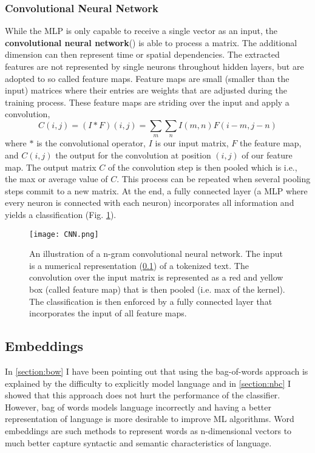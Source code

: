 \subsubsection{Convolutional Neural Network}
While the MLP is only capable to receive a single vector as an input, the \textbf{convolutional neural network}() is able to process a matrix. The additional dimension can then represent time or spatial dependencies. The extracted features are not represented by single neurons throughout hidden layers, but are adopted to so called feature maps. Feature maps are small (smaller than the input) matrices where their entries are weights that are adjusted during the training process. These feature maps are striding over the input and apply a convolution,
\[C(i,j) = (I \ast F)(i,j) = \sum_m \sum_n I(m, n) F(i-m, j-n)\] where $\ast$ is the convolutional operator, $I$ is our input matrix, $F$ the feature map, and $C(i,j)$ the output for the convolution at position $(i,j)$ of our feature map. The output matrix $C$ of the convolution step is then pooled which is i.e., the max or average value of $C$. This process can be repeated when several pooling steps commit to a new matrix. At the end, a fully connected layer (a MLP where every neuron is connected with each neuron) incorporates all information and yields a classification (Fig. \ref{fig:cnn}).
\begin{figure}[h!]
    \centering
    \texttt{[image: CNN.png]}
    \caption{An illustration of a n-gram convolutional neural network. The input is a numerical representation (\ref{section:embeddings}) of a tokenized text. The convolution over the input matrix is represented as a red and yellow box (called feature map) that is then pooled (i.e. max of the kernel). The classification is then enforced by a fully connected layer that incorporates the input of all feature maps.}
    \label{fig:cnn}
\end{figure}


\subsection{Embeddings}\label{section:embeddings}

In \ref{section:bow} I have been pointing out that using the bag-of-words approach is explained by the difficulty to explicitly model language and in \ref{section:nbc} I showed that this approach does not hurt the performance of the classifier. However, bag of words models language incorrectly and having a better representation of language is more desirable to improve ML algorithms. Word embeddings are such methods to represent words as n-dimensional vectors to much better capture syntactic and semantic characteristics of language.


